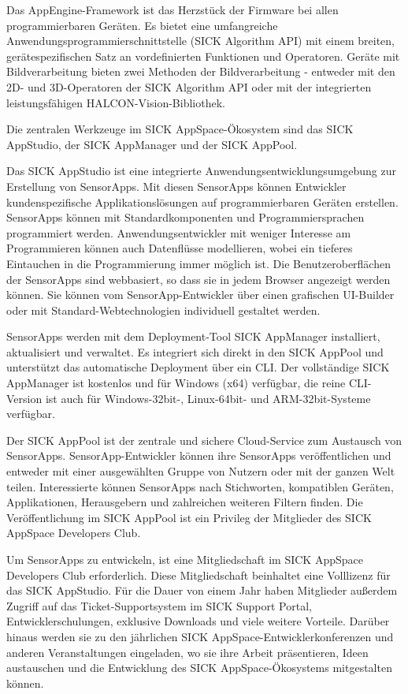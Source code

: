 Das AppEngine-Framework ist das Herzstück der Firmware bei allen programmierbaren Geräten. Es bietet eine umfangreiche Anwendungsprogrammierschnittstelle (SICK Algorithm API) mit einem breiten, gerätespezifischen Satz an vordefinierten Funktionen und Operatoren. Geräte mit Bildverarbeitung bieten zwei Methoden der Bildverarbeitung - entweder mit den 2D- und 3D-Operatoren der SICK Algorithm API oder mit der integrierten leistungsfähigen HALCON-Vision-Bibliothek.

Die zentralen Werkzeuge im SICK AppSpace-Ökosystem sind das SICK AppStudio, der SICK AppManager und der SICK AppPool.


Das SICK AppStudio ist eine integrierte Anwendungsentwicklungsumgebung zur Erstellung von SensorApps. Mit diesen SensorApps können Entwickler kundenspezifische Applikationslösungen auf programmierbaren Geräten erstellen. SensorApps können mit Standardkomponenten und Programmiersprachen programmiert werden. Anwendungsentwickler mit weniger Interesse am Programmieren können auch Datenflüsse modellieren, wobei ein tieferes Eintauchen in die Programmierung immer möglich ist. Die Benutzeroberflächen der SensorApps sind webbasiert, so dass sie in jedem Browser angezeigt werden können. Sie können vom SensorApp-Entwickler über einen grafischen UI-Builder oder mit Standard-Webtechnologien individuell gestaltet werden.

 

SensorApps werden mit dem Deployment-Tool SICK AppManager installiert, aktualisiert und verwaltet. Es integriert sich direkt in den SICK AppPool und unterstützt das automatische Deployment über ein CLI. Der vollständige SICK AppManager ist kostenlos und für Windows (x64) verfügbar, die reine CLI-Version ist auch für Windows-32bit-, Linux-64bit- und ARM-32bit-Systeme verfügbar.

 

Der SICK AppPool ist der zentrale und sichere Cloud-Service zum Austausch von SensorApps. SensorApp-Entwickler können ihre SensorApps veröffentlichen und entweder mit einer ausgewählten Gruppe von Nutzern oder mit der ganzen Welt teilen. Interessierte können SensorApps nach Stichworten, kompatiblen Geräten, Applikationen, Herausgebern und zahlreichen weiteren Filtern finden. Die Veröffentlichung im SICK AppPool ist ein Privileg der Mitglieder des SICK AppSpace Developers Club.

 

Um SensorApps zu entwickeln, ist eine Mitgliedschaft im SICK AppSpace Developers Club erforderlich. Diese Mitgliedschaft beinhaltet eine Volllizenz für das SICK AppStudio. Für die Dauer von einem Jahr haben Mitglieder außerdem Zugriff auf das Ticket-Supportsystem im SICK Support Portal, Entwicklerschulungen, exklusive Downloads und viele weitere Vorteile. Darüber hinaus werden sie zu den jährlichen SICK AppSpace-Entwicklerkonferenzen und anderen Veranstaltungen eingeladen, wo sie ihre Arbeit präsentieren, Ideen austauschen und die Entwicklung des SICK AppSpace-Ökosystems mitgestalten können.


